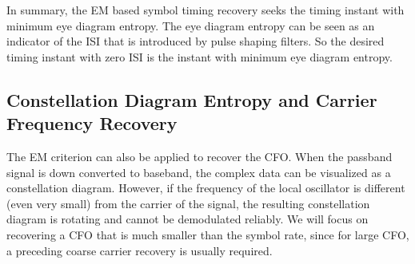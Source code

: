 \documentclass[journal,comsoc]{IEEEtran}
\begin{document}
In summary, the EM based symbol timing recovery seeks the timing instant with minimum eye diagram entropy. 
The eye diagram entropy can be seen as an indicator of the ISI that is introduced by pulse shaping filters.
So the  desired timing instant with zero ISI is the instant with minimum eye diagram entropy. 


\subsection{Constellation Diagram Entropy and Carrier Frequency Recovery}
\label{sec:const_entp}
The EM criterion can also be applied to recover the CFO.
When the passband signal is down converted to baseband, the complex data can be visualized as a constellation diagram.
However, if the frequency of the local oscillator is  different (even very small) from the carrier of the signal, the resulting constellation diagram is rotating and cannot be demodulated reliably.
We will focus on recovering a CFO that is much smaller than the symbol rate, since for large CFO, a preceding coarse carrier recovery is usually required.
\end{document}

